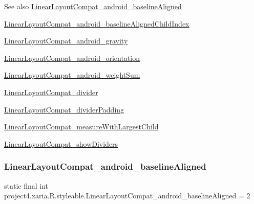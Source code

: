 \begin{DoxySeeAlso}{See also}
\hyperlink{classproject4_1_1xaria_1_1R_1_1styleable_a9be6e1f075c0511bc62f02db852f77d5}{Linear\+Layout\+Compat\+\_\+android\+\_\+baseline\+Aligned} 

\hyperlink{classproject4_1_1xaria_1_1R_1_1styleable_ab84764f190efeef60cefb6eba9332ba5}{Linear\+Layout\+Compat\+\_\+android\+\_\+baseline\+Aligned\+Child\+Index} 

\hyperlink{classproject4_1_1xaria_1_1R_1_1styleable_a2a3b513c0f7f71ed6b75218dd32d011e}{Linear\+Layout\+Compat\+\_\+android\+\_\+gravity} 

\hyperlink{classproject4_1_1xaria_1_1R_1_1styleable_a2cd81e7b3c982ef6daea0093965c9ea9}{Linear\+Layout\+Compat\+\_\+android\+\_\+orientation} 

\hyperlink{classproject4_1_1xaria_1_1R_1_1styleable_a3787a7bcd5b812a12873e33ec20a496c}{Linear\+Layout\+Compat\+\_\+android\+\_\+weight\+Sum} 

\hyperlink{classproject4_1_1xaria_1_1R_1_1styleable_a203fc5f441152f8ffcecb5604e918fa0}{Linear\+Layout\+Compat\+\_\+divider} 

\hyperlink{classproject4_1_1xaria_1_1R_1_1styleable_aabd76c769aacad577cc5b52c4a9cffb6}{Linear\+Layout\+Compat\+\_\+divider\+Padding} 

\hyperlink{classproject4_1_1xaria_1_1R_1_1styleable_a83b43869079dce397a9b632d885316f2}{Linear\+Layout\+Compat\+\_\+measure\+With\+Largest\+Child} 

\hyperlink{classproject4_1_1xaria_1_1R_1_1styleable_aa54ceb6abf29ba55186f4ef137e636d8}{Linear\+Layout\+Compat\+\_\+show\+Dividers} 
\end{DoxySeeAlso}
\mbox{\label{classproject4_1_1xaria_1_1R_1_1styleable_a9be6e1f075c0511bc62f02db852f77d5}} 
\subsubsection{\texorpdfstring{Linear\+Layout\+Compat\+\_\+android\+\_\+baseline\+Aligned}{LinearLayoutCompat\_android\_baselineAligned}}
{\footnotesize\ttfamily static final int project4.\+xaria.\+R.\+styleable.\+Linear\+Layout\+Compat\+\_\+android\+\_\+baseline\+Aligned = 2\hspace{0.3cm}{\ttfamily [static]}}

